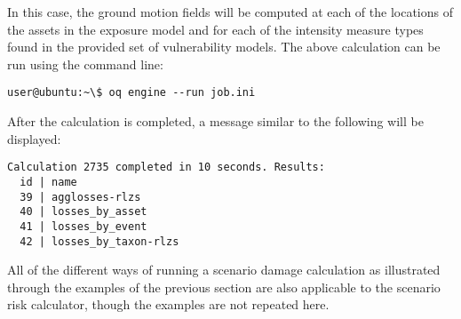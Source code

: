 In this case, the ground motion fields will be computed at each of the
locations of the assets in the exposure model and for each of the intensity
measure types found in the provided set of vulnerability models. The above
calculation can be run using the command line:

\begin{verbatim}
user@ubuntu:~\$ oq engine --run job.ini
\end{verbatim}

After the calculation is completed, a message similar to the following will be
displayed:

\begin{verbatim}
Calculation 2735 completed in 10 seconds. Results:
  id | name
  39 | agglosses-rlzs
  40 | losses_by_asset
  41 | losses_by_event
  42 | losses_by_taxon-rlzs
\end{verbatim}

All of the different ways of running a scenario damage calculation as
illustrated through the examples of the previous section are also applicable
to the scenario risk calculator, though the examples are not repeated here.
